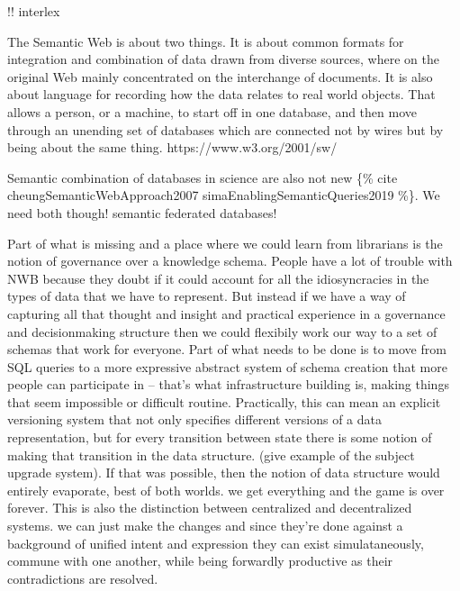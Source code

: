 \documentclass{article}
\begin{document}
!! interlex

\begin{leftbar}
The Semantic Web is about two things. It is about common formats for
integration and combination of data drawn from diverse sources, where on
the original Web mainly concentrated on the interchange of documents. It
is also about language for recording how the data relates to real world
objects. That allows a person, or a machine, to start off in one
database, and then move through an unending set of databases which are
connected not by wires but by being about the same thing.
https://www.w3.org/2001/sw/
\end{leftbar}

Semantic combination of databases in science are also not new \{\% cite
cheungSemanticWebApproach2007 simaEnablingSemanticQueries2019 \%\}. We
need both though! semantic federated databases!

Part of what is missing and a place where we could learn from librarians
is the notion of governance over a knowledge schema. People have a lot
of trouble with NWB because they doubt if it could account for all the
idiosyncracies in the types of data that we have to represent. But
instead if we have a way of capturing all that thought and insight and
practical experience in a governance and decisionmaking structure then
we could flexibily work our way to a set of schemas that work for
everyone. Part of what needs to be done is to move from SQL queries to a
more expressive abstract system of schema creation that more people can
participate in -- that's what infrastructure building is, making things
that seem impossible or difficult routine. Practically, this can mean an
explicit versioning system that not only specifies different versions of
a data representation, but for every transition between state there is
some notion of making that transition in the data structure. (give
example of the subject upgrade system). If that was possible, then the
notion of data structure would entirely evaporate, best of both worlds.
we get everything and the game is over forever. This is also the
distinction between centralized and decentralized systems. we can just
make the changes and since they're done against a background of unified
intent and expression they can exist simulataneously, commune with one
another, while being forwardly productive as their contradictions are
resolved.
\end{document}
